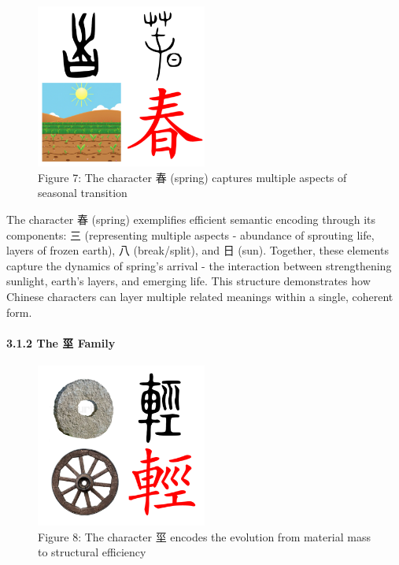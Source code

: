 \documentclass[
  11pt,
  letterpaper,
]{article}
\begin{document}
\begin{figure}
\centering
\includegraphics[width=0.5\textwidth]{./images/zi_spring.png}
\caption{Figure 7: The character 春 (spring) captures multiple aspects of
seasonal transition}
\end{figure}



The character 春 (spring) exemplifies efficient semantic encoding
through its components: 三 (representing multiple aspects - abundance of
sprouting life, layers of frozen earth), 八 (break/split), and 日 (sun).
Together, these elements capture the dynamics of spring's arrival - the
interaction between strengthening sunlight, earth's layers, and emerging
life. This structure demonstrates how Chinese characters can layer
multiple related meanings within a single, coherent form.

\paragraph{3.1.2 The 坙 Family}\label{the-ux5759-family}

\begin{figure}
\centering
\includegraphics[width=0.5\textwidth]{./images/zi_stem.png} 
\caption{Figure 8: The character 坙
encodes the evolution from material mass to structural efficiency}
\end{figure}
\end{document}
